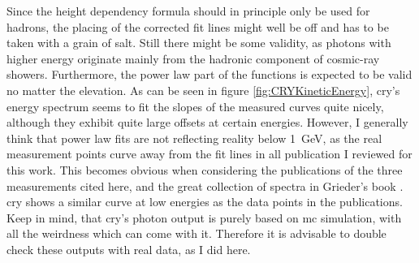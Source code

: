 Since the height dependency formula should in principle only be used for hadrons, the placing of the corrected fit lines might well be off and has to be taken with a grain of salt. Still there might be some validity, as photons with higher energy originate mainly from the hadronic component of cosmic-ray showers. Furthermore, the power law part of the functions is expected to be valid no matter the elevation. As can be seen in figure \ref{fig:CRYKineticEnergy}, \gls{cry}'s energy spectrum seems to fit the slopes of the measured curves quite nicely, although they exhibit quite large offsets at certain energies. However, I generally think that power law fits are not reflecting reality below \SI{1}{\giga\electronvolt}, as the real measurement points curve away from the fit lines in all publication I reviewed for this work. This becomes obvious when considering the publications of the three measurements cited here, and the great collection of spectra in Grieder's book \cite{CosmicRayGrieder}. \Gls{cry} shows a similar curve at low energies as the data points in the publications. Keep in mind, that \gls{cry}'s photon output is purely based on \gls{mc} simulation, with all the weirdness which can come with it. Therefore it is advisable to double check these outputs with real data, as I did here.

